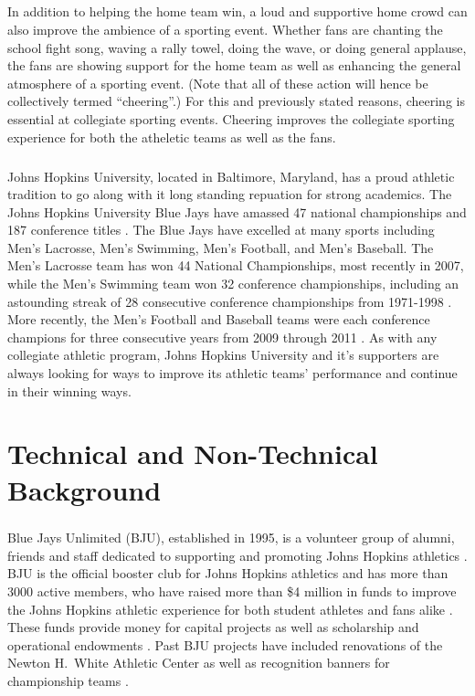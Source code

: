 \documentclass[oneside,12pt]{report}
\def\prefacesection#1{
\chapter*{#1}
\addcontentsline{toc}{chapter}{#1}
}
\begin{document}
\paragraph{}
In addition to helping the home team win, a loud and supportive home crowd can also improve the ambience of a sporting event. Whether fans are chanting the school fight song, waving a rally towel, doing the wave, or doing general applause, the fans are showing support for the home team as well as enhancing the general atmosphere of a sporting event. (Note that all of these action will hence be collectively termed ``cheering''.) For this and previously stated reasons, cheering is essential at collegiate sporting events. Cheering improves the collegiate sporting experience for both the atheletic teams as well as the fans. 

\paragraph{}
Johns Hopkins University, located in Baltimore, Maryland, has a proud athletic tradition to go along with it long standing repuation for strong academics. The Johns Hopkins University Blue Jays have amassed 47 national championships and 187 conference titles \cite{hopathletic}. The Blue Jays have excelled at many sports including Men's Lacrosse, Men's Swimming, Men's Football, and Men's Baseball. The Men's Lacrosse team has won 44 National Championships, most recently in 2007, while the Men's Swimming team won 32 conference championships, including an astounding streak of 28 consecutive conference championships from 1971-1998 \cite{hopathletic}. More recently, the Men's Football and Baseball teams were each conference champions for three consecutive years from 2009 through 2011 \cite{hopathletic}. As with any collegiate athletic program, Johns Hopkins University and it's supporters are always looking for ways to improve its athletic teams' performance and continue in their winning ways.

\prefacesection{Technical and Non-Technical Background}
\paragraph{} 
Blue Jays Unlimited (BJU), established in 1995, is a volunteer group of alumni, friends and staff dedicated to supporting and promoting Johns Hopkins athletics \cite{bjuwebsite}. BJU is the official booster club for Johns Hopkins athletics and has more than 3000 active members, who have raised more than \$4 million in funds to improve the Johns Hopkins athletic experience for both student athletes and fans alike \cite{bjuwebsite}. These funds provide money for capital projects as well as scholarship and operational endowments \cite{bjuwebsite}. Past BJU projects have included renovations of the Newton H.~White Athletic Center as well as recognition banners for championship teams \cite{bjuwebsite}.
\end{document}
